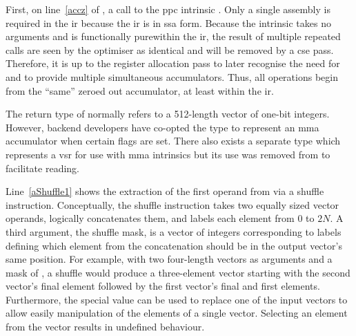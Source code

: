 \documentclass[\main/thesis.tex]{subfiles}
\begin{document}
First, on line~\ref{accz} of , a call to the \gls{ppc} \gls{intrinsic} .\footnotemark
{}
Only a single assembly is required in the \gls{ir} because the \gls{ir} is in \gls{ssa} form.
Because the \gls{intrinsic} takes no arguments and is functionally pure\footnotemark within the \gls{ir}, the result of multiple repeated calls are seen by the optimiser as identical and will be removed by a \gls{cse} pass.
Therefore, it is up to the register allocation pass to later recognise the need for and to provide multiple simultaneous accumulators.
Thus, all operations begin from the ``same'' zeroed out accumulator, at least within the \gls{ir}.

The  return type of  normally refers to a 512-length vector of one-bit integers.
However, backend developers have co-opted the type to represent an \gls{mma} accumulator when certain flags are set.
There also exists a separate type which represents a \gls{vsr} for use with \gls{mma} \glspl{intrinsic} but its use was removed from  to facilitate reading.\footnotemark
{}

Line~\ref{aShuffle1} shows the extraction of the first operand from  via a shuffle instruction.
Conceptually, the shuffle instruction takes two equally sized vector operands, logically concatenates them, and labels each element from $0$ to $2N$.
A third argument, the shuffle mask, is a vector of integers corresponding to labels defining which element from the concatenation should be in the output vector's same position.
For example, with two four-length vectors as arguments and a mask of , a shuffle would produce a three-element vector starting with the second vector's final element followed by the first vector's final and first elements.
Furthermore, the special value  can be used to replace one of the input vectors to allow easily manipulation of the elements of a single vector.
Selecting an element from the  vector results in undefined behaviour.
\end{document}
